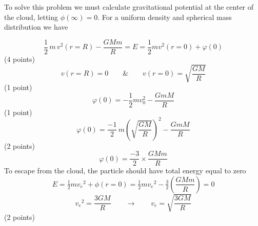 To solve this problem we must calculate gravitational potential at the center
of the cloud, letting $\phi(\infty) = 0$. For a uniform density and spherical
mass distribution we have

\[
  \frac{1}{2}\,m\,v^2(r=R) - \frac{GMm}{R} = E
  = \frac{1}{2}mv^2(r=0) + \varphi(0)
\]
\hfill(4 points)
\[
  v(r=R) = 0 \qquad \& \qquad v(r=0) = \sqrt{\frac{GM}{R}}
\]
\hfill(1 point)
\[
  \varphi(0) = -\frac{1}{2}mv_0^2 - \frac{GmM}{R}
\]
\hfill(1 point)
\[
  \varphi(0) = \frac{-1}{2}\,m\left(\sqrt{\frac{GM}{R}}\right)^2
             - \frac{GmM}{R}
\]
\hfill(2 points)
\[
  \varphi(0) = \frac{-3}{2}\times\frac{GMm}{R}
\]
To escape from the cloud, the particle should have total energy equal to zero
\[
  E = \tfrac{1}{2}m{v_e}^2 + \phi(r=0)
    = \tfrac{1}{2}m{v_e}^2 - \tfrac{3}{2}\left(\frac{GMm}{R}\right) = 0
\]
\[
  {v_e}^2 = \frac{3GM}{R}
  \qquad\rightarrow\qquad
  v_e = \sqrt{\frac{3GM}{R}}
\]
\hfill(2 points)
